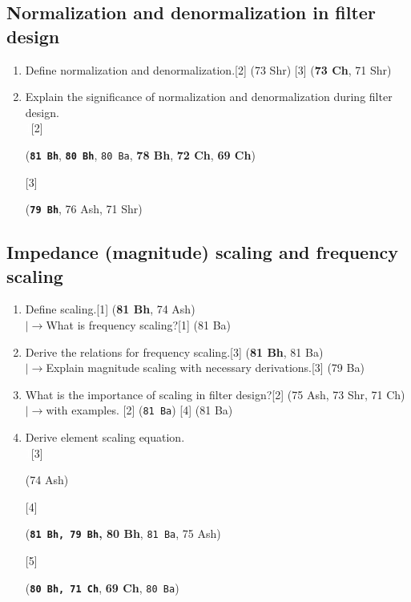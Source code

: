\documentclass[12pt]{article}
\newcommand{\lb}{\\$\left|\rightarrow\right.$}
\newcommand{\enter}{\\\textcolor{white}{1}}
\begin{document}
	\subsection{Normalization and denormalization in filter design}
		\begin{enumerate}
			\item Define normalization and denormalization.\hfill[2] (73 Shr) [3] (\textbf{73 Ch}, 71 Shr)
			\item Explain the significance of normalization and denormalization during filter design.
			\enter \hfill [2] \begin{footnotesize} (\textbf{\texttt{81 Bh}}, \textbf{\texttt{80 Bh}}, \texttt{80 Ba}, \textbf{78 Bh}, \textbf{72 Ch}, \textbf{69 Ch}) \end{footnotesize} [3] \begin{footnotesize} (\textbf{\texttt{79 Bh}}, 76 Ash, 71 Shr) \end{footnotesize}
		\end{enumerate}

	\subsection{Impedance (magnitude) scaling and frequency scaling}
		\begin{enumerate}
			\item Define scaling.\hfill[1] (\textbf{81 Bh}, 74 Ash)
			\lb What is frequency scaling?\hfill[1] (81 Ba)
			\item Derive the relations for frequency scaling.\hfill[3] (\textbf{81 Bh}, 81 Ba)
			\lb  Explain magnitude scaling with necessary derivations.\hfill[3] (79 Ba)
			\item What is the importance of scaling in filter design?\hfill[2] (75 Ash, 73 Shr, 71 Ch)
			\lb  with examples. \hfill[2] (\texttt{81 Ba}) [4] (81 Ba)
			\item Derive element scaling equation.
			\enter \hfill [3] \begin{footnotesize} (74 Ash) \end{footnotesize} [4] \begin{footnotesize} (\textbf{\texttt{81 Bh, 79 Bh}, 80 Bh}, \texttt{81 Ba}, 75 Ash) \end{footnotesize} [5] \begin{footnotesize} (\textbf{\texttt{80 Bh, 71 Ch}}, \textbf{69 Ch}, \texttt{80 Ba}) \end{footnotesize}
		\end{enumerate}
\end{document}
